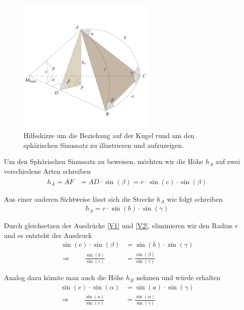 \begin{refsection}
\begin{figure}[hbtp]
\centering
\includegraphics[width=0.6\textwidth]{kugel/Sinussatz.jpg}
\caption{Hilfsskizze um die Beziehung auf der Kugel rund um den sphärischen Sinussatz zu illustrieren und aufzuzeigen.}
\end{figure}

Um den Sphärischen Sinussatz zu beweisen, möchten wir die Höhe $h_{A}$ auf zwei verschiedene Arten schreiben
\begin{align}
h_{A} = \overline{AF} &= \overline{AD} \cdot \sin(\beta) = r \cdot \sin(c) \cdot \sin(\beta)  
\label {V1}
\end{align}

Aus einer anderen Sichtweise lässt sich die Strecke $h_{A}$ wie folgt schreiben
\begin{align}
h_{A} = r \cdot \sin(b) \cdot \sin(\gamma)  
\label {V2}
\end{align}

Durch gleichsetzen der Ausdrücke \eqref{V1} und \eqref{V2}, eliminieren wir den Radius $r$ und es entsteht der Ausdruck
\begin{align*}
\sin(c) \cdot \sin(\beta) &= \sin(b) \cdot \sin(\gamma) \\
\Rightarrow \quad \quad
\frac{\sin (b)}{\sin (c)} &= \frac{\sin (\beta)}{\sin (\gamma)}
\end{align*}

Analog dazu könnte man auch die Höhe $h_{B}$ nehmen und würde erhalten
\begin{align*}
\sin(c) \cdot \sin(\alpha) &= \sin(a) \cdot \sin(\gamma) \\
\Rightarrow \quad \quad
\frac{\sin (a)}{\sin (c)} &= \frac{\sin (\alpha)}{\sin (\gamma)}
\end{align*}


\end{refsection}
